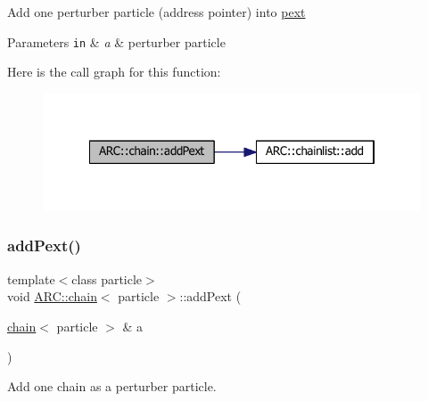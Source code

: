 Add one perturber particle (address pointer) into \hyperlink{classARC_1_1chain_a6e4f41c7d3f8d44a4a01734ff4ab20cf}{pext} 
\begin{DoxyParams}[1]{Parameters}
\mbox{\tt in}  & {\em a} & perturber particle \\
\hline
\end{DoxyParams}
Here is the call graph for this function\+:
\nopagebreak
\begin{figure}[H]
\begin{center}
\leavevmode
\includegraphics[width=322pt]{classARC_1_1chain_a029906394e7b73881c0980c00bf978f7_cgraph}
\end{center}
\end{figure}
\hypertarget{classARC_1_1chain_a5ab3934ce4a203cd57bfabcc3caf54b3}{}\label{classARC_1_1chain_a5ab3934ce4a203cd57bfabcc3caf54b3} 
\subsubsection{\texorpdfstring{add\+Pext()}{addPext()}\hspace{0.1cm}{\footnotesize\ttfamily [2/3]}}
{\footnotesize\ttfamily template$<$class particle$>$ \\
void \hyperlink{classARC_1_1chain}{A\+R\+C\+::chain}$<$ particle $>$\+::add\+Pext (\begin{DoxyParamCaption}\item[{\hyperlink{classARC_1_1chain}{chain}$<$ particle $>$ \&}]{a }\end{DoxyParamCaption})\hspace{0.3cm}{\ttfamily [inline]}}



Add one chain as a perturber particle. 

